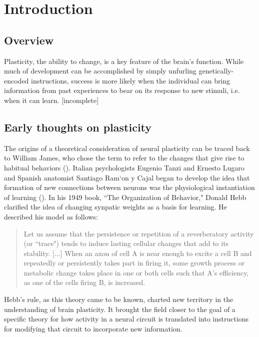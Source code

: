 \chapter{Introduction}

\section{Overview}

Plasticity, the ability to change, is a key feature of the brain's function. While much of development can be accomplished by simply unfurling genetically-encoded instructions, success is more likely when the individual can bring information from past experiences to bear on its response to new stimuli, i.e. when it can learn. [incomplete]

\section{Early thoughts on plasticity}
The origins of a theoretical consideration of neural plasticity can be traced back to William James, who chose the term to refer to the changes that give rise to habitual behaviors (\cite{James1910, Berlucchi2009}). Italian psychologists Eugenio Tanzi and Ernesto Lugaro and Spanish anatomist Santiago Ram\a`on y Cajal began to develop the idea that formation of new connections between neurons was the physiological instantiation of learning (\cite{Berlucchi2009}). In his 1949 book, ``The Organization of Behavior," Donald Hebb clarified the idea of changing synpatic weights as a basis for learning. He described his model as follows:

\begin{quotation}
Let us assume that the persistence or repetition of a reverberatory activity (or ``trace") tends to induce lasting cellular changes that add to its stability. [...] When an axon of cell A is near enough to excite a cell B and repeatedly or persistently takes part in firing it, some growth process or metabolic change takes place in one or both cells such that A's efficiency, as one of the cells firing B, is increased.
\end{quotation}

Hebb's rule, as this theory came to be known, charted new territory in the understanding of brain plasticity. It brought the field closer to the goal of a specific theory for how activity in a neural circuit is translated into instructions for modifying that circuit to incorporate new information.

